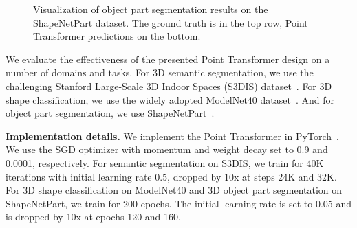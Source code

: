 \documentclass[final]{cvpr}
\newcommand\mypara[1]{\vspace{1mm}\noindent\textbf{#1}}
\begin{document}
\begin{figure*}[!h]
	\centering
	\caption{Visualization of object part segmentation results on the ShapeNetPart dataset. The ground truth is in the top row, Point Transformer predictions on the bottom.}
	\label{fig:shapenetpartvisual}
\end{figure*}

We evaluate the effectiveness of the presented Point Transformer design on a number of domains and tasks. For 3D semantic segmentation, we use the challenging Stanford Large-Scale 3D Indoor Spaces (S3DIS) dataset~\cite{armeni2016s3dis}. For 3D shape classification, we use the widely adopted ModelNet40 dataset~\cite{wu2015modelnet}. And for object part segmentation, we use ShapeNetPart~\cite{yi2016scalable}.

\mypara{Implementation details.}
We implement the Point Transformer in PyTorch~\cite{Paszke2019Pytorch}. We use the SGD optimizer with momentum and weight decay set to 0.9 and 0.0001, respectively. For semantic segmentation on S3DIS, we train for 40K iterations with initial learning rate 0.5, dropped by 10x at steps 24K and 32K. For 3D shape classification on ModelNet40 and 3D object part segmentation on ShapeNetPart, we train for 200 epochs. The initial learning rate is set to 0.05 and is dropped by 10x at epochs 120 and 160.
\end{document}
